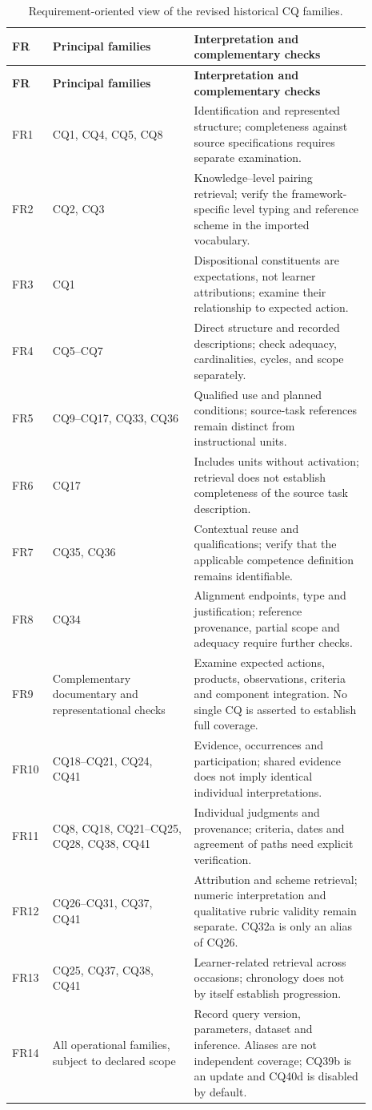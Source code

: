 \begingroup
\small
\begin{longtable}{p{0.08\linewidth} p{0.36\linewidth} p{0.45\linewidth}}
\caption{Requirement-oriented view of the revised historical CQ families.} \\
\toprule
\textbf{FR} & \textbf{Principal families} & \textbf{Interpretation and complementary checks} \\
\midrule
\endfirsthead
\toprule
\textbf{FR} & \textbf{Principal families} & \textbf{Interpretation and complementary checks} \\
\midrule
\endhead
\bottomrule
\endfoot
FR1 & CQ1, CQ4, CQ5, CQ8 & Identification and represented structure; completeness against source specifications requires separate examination. \\
FR2 & CQ2, CQ3 & Knowledge--level pairing retrieval; verify the framework-specific level typing and reference scheme in the imported vocabulary. \\
FR3 & CQ1 & Dispositional constituents are expectations, not learner attributions; examine their relationship to expected action. \\
FR4 & CQ5--CQ7 & Direct structure and recorded descriptions; check adequacy, cardinalities, cycles, and scope separately. \\
FR5 & CQ9--CQ17, CQ33, CQ36 & Qualified use and planned conditions; source-task references remain distinct from instructional units. \\
FR6 & CQ17 & Includes units without activation; retrieval does not establish completeness of the source task description. \\
FR7 & CQ35, CQ36 & Contextual reuse and qualifications; verify that the applicable competence definition remains identifiable. \\
FR8 & CQ34 & Alignment endpoints, type and justification; reference provenance, partial scope and adequacy require further checks. \\
FR9 & Complementary documentary and representational checks & Examine expected actions, products, observations, criteria and component integration. No single CQ is asserted to establish full coverage. \\
FR10 & CQ18--CQ21, CQ24, CQ41 & Evidence, occurrences and participation; shared evidence does not imply identical individual interpretations. \\
FR11 & CQ8, CQ18, CQ21--CQ25, CQ28, CQ38, CQ41 & Individual judgments and provenance; criteria, dates and agreement of paths need explicit verification. \\
FR12 & CQ26--CQ31, CQ37, CQ41 & Attribution and scheme retrieval; numeric interpretation and qualitative rubric validity remain separate. CQ32a is only an alias of CQ26. \\
FR13 & CQ25, CQ37, CQ38, CQ41 & Learner-related retrieval across occasions; chronology does not by itself establish progression. \\
FR14 & All operational families, subject to declared scope & Record query version, parameters, dataset and inference. Aliases are not independent coverage; CQ39b is an update and CQ40d is disabled by default. \\
\end{longtable}
